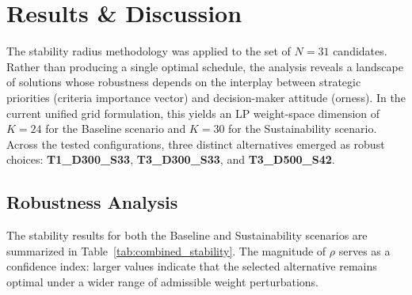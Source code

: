 \section{Results \& Discussion}
\label{sec:results}

The stability radius methodology was applied to the set of $N=31$ candidates. Rather than producing a single optimal schedule, the analysis reveals a landscape of solutions whose robustness depends on the interplay between strategic priorities (criteria importance vector) and decision-maker attitude (orness). In the current unified grid formulation, this yields an LP weight-space dimension of $K=24$ for the Baseline scenario and $K=30$ for the Sustainability scenario. Across the tested configurations, three distinct alternatives emerged as robust choices: \textbf{T1\_D300\_S33}, \textbf{T3\_D300\_S33}, and \textbf{T3\_D500\_S42}.

\subsection{Robustness Analysis}

The stability results for both the Baseline and Sustainability scenarios are summarized in Table~\ref{tab:combined_stability}. The magnitude of $\rho$ serves as a confidence index: larger values indicate that the selected alternative remains optimal under a wider range of admissible weight perturbations.

